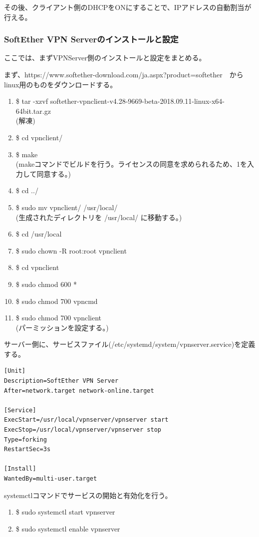 \documentclass[11pt,a4j,titlepage]{jreport}
\begin{document}
その後、クライアント側のDHCPをONにすることで、IPアドレスの自動割当が行える。

\subsubsection*{SoftEther VPN Serverのインストールと設定}
ここでは、まずVPNServer側のインストールと設定をまとめる。\par

まず、https://www.softether-download.com/ja.aspx?product=softether　からlinux用のものをダウンロードする。

\begin{enumerate}
    \setlength{\parskip}{0.0cm} %
    \setlength{\itemsep}{0.0cm} 
    \item \$ tar -xzvf softether-vpnclient-v4.28-9669-beta-2018.09.11-linux-x64-64bit.tar.gz\\ (解凍)
    \item \$ cd vpnclient/
    \item \$ make \\ (makeコマンドでビルドを行う。ライセンスの同意を求められるため、1を入力して同意する。)
    \item \$ cd ../
    \item \$ sudo mv vpnclient/ /usr/local/ \\ (生成されたディレクトリを /usr/local/ に移動する。)
    \item \$ cd /usr/local
    \item \$ sudo chown -R root:root vpnclient
    \item \$ cd vpnclient
    \item \$ sudo chmod 600 *
    \item \$ sudo chmod 700 vpncmd
    \item \$ sudo chmod 700 vpnclient \\(パーミッションを設定する。)
    
\end{enumerate}

サーバー側に、サービスファイル(/etc/systemd/system/vpnserver.service)を定義する。
\begin{lstlisting}
[Unit]
Description=SoftEther VPN Server
After=network.target network-online.target

[Service]
ExecStart=/usr/local/vpnserver/vpnserver start
ExecStop=/usr/local/vpnserver/vpnserver stop
Type=forking
RestartSec=3s

[Install]
WantedBy=multi-user.target

\end{lstlisting}
systemctlコマンドでサービスの開始と有効化を行う。
\begin{enumerate}
    \setlength{\parskip}{0.0cm} %
    \setlength{\itemsep}{0.0cm} 
    \item \$ sudo systemctl start vpnserver
    \item \$ sudo systemctl enable vpnserver
\end{enumerate}
\end{document}
